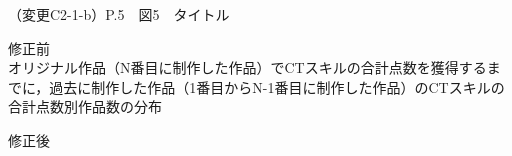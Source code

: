 \documentclass{jarticle} %
\def\subsection#1{ \vspace{1pc} {\gt #1} }
\begin{document}
\newpage
\subsection{（変更C2-1-b）P.5　図5　タイトル}
\vspace{-0.3cm}
\begin{description}
\item 修正前\\
\phantom{　}
オリジナル作品（N番目に制作した作品）でCTスキルの合計点数を獲得するまでに，過去に制作した作品（1番目からN-1番目に制作した作品）のCTスキルの合計点数別作品数の分布
\vspace{-0.3cm}
\item 修正後\\
\phantom{　}
\textcolor{red}{}
\end{description}



	
\end{document}
